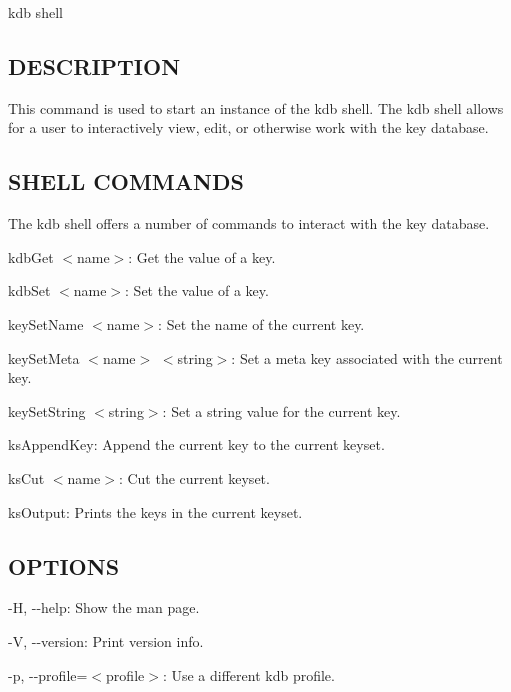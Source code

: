 {\ttfamily kdb shell}

\subsection*{D\+E\+S\+C\+R\+I\+P\+T\+I\+O\+N}

This command is used to start an instance of the kdb shell. The kdb shell allows for a user to interactively view, edit, or otherwise work with the key database.

\subsection*{S\+H\+E\+L\+L C\+O\+M\+M\+A\+N\+D\+S}

The kdb shell offers a number of commands to interact with the key database.


\begin{DoxyItemize}
\item {\ttfamily kdb\+Get $<$name$>$}\+: Get the value of a key.
\item {\ttfamily kdb\+Set $<$name$>$}\+: Set the value of a key.
\item {\ttfamily key\+Set\+Name $<$name$>$}\+: Set the name of the current key.
\item {\ttfamily key\+Set\+Meta $<$name$>$ $<$string$>$}\+: Set a meta key associated with the current key.
\item {\ttfamily key\+Set\+String $<$string$>$}\+: Set a string value for the current key.
\item {\ttfamily ks\+Append\+Key}\+: Append the current key to the current keyset.
\item {\ttfamily ks\+Cut $<$name$>$}\+: Cut the current keyset.
\item {\ttfamily ks\+Output}\+: Prints the keys in the current keyset.
\end{DoxyItemize}

\subsection*{O\+P\+T\+I\+O\+N\+S}


\begin{DoxyItemize}
\item {\ttfamily -\/\+H}, {\ttfamily -\/-\/help}\+: Show the man page.
\item {\ttfamily -\/\+V}, {\ttfamily -\/-\/version}\+: Print version info.
\item {\ttfamily -\/p}, {\ttfamily -\/-\/profile}=$<$profile$>$\+: Use a different kdb profile.
\end{DoxyItemize}

